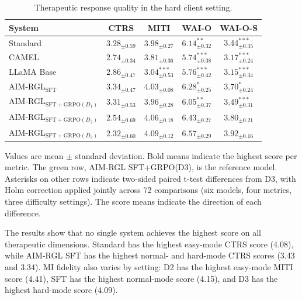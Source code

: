 \begin{table}[H]
\centering
\caption{Therapeutic response quality in the hard client setting.}
\label{tab:main-results-hard}
\small
\setlength{\tabcolsep}{4pt}
\renewcommand{\arraystretch}{1.15}
\begin{tabular}{lcccc}
\toprule
System & CTRS & MITI & WAI-O & WAI-O-S \\
\midrule
Standard & $3.28_{\pm 0.59}$ & $3.98_{\pm 0.27}$ & $6.14_{\pm 0.32}^{**}$ & $3.44_{\pm 0.35}^{***}$ \\
CAMEL & $2.74_{\pm 0.34}$ & $3.81_{\pm 0.36}$ & $5.74_{\pm 0.38}^{***}$ & $3.17_{\pm 0.24}^{***}$ \\
LLaMA Base & $2.86_{\pm 0.47}$ & $3.04_{\pm 0.53}^{***}$ & $5.76_{\pm 0.42}^{***}$ & $3.15_{\pm 0.34}^{***}$ \\
AIM-RGL$_{\mathrm{SFT}}$ & $\mathbf{3.34}_{\pm 0.47}$ & $4.03_{\pm 0.08}$ & $6.28_{\pm 0.25}^{*}$ & $3.70_{\pm 0.24}^{*}$ \\
AIM-RGL$_{\mathrm{SFT+GRPO}(D_1)}$ & $3.31_{\pm 0.53}$ & $3.96_{\pm 0.28}$ & $6.05_{\pm 0.37}^{**}$ & $3.49_{\pm 0.31}^{***}$ \\
AIM-RGL$_{\mathrm{SFT+GRPO}(D_2)}$ & $2.54_{\pm 0.69}$ & $4.06_{\pm 0.18}$ & $6.43_{\pm 0.27}$ & $3.80_{\pm 0.21}$ \\
\rowcolor{green!15}
AIM-RGL$_{\mathrm{SFT+GRPO}(D_3)}$ & $2.32_{\pm 0.60}$ & $\mathbf{4.09}_{\pm 0.12}$ & $\mathbf{6.57}_{\pm 0.29}$ & $\mathbf{3.92}_{\pm 0.16}$ \\
\bottomrule
\end{tabular}
\par\smallskip
\begin{minipage}{\textwidth}
\footnotesize
\linespread{1.1}\selectfont
Values are mean $\pm$ standard deviation. Bold means indicate the highest score per metric. The green row, AIM-RGL SFT+GRPO(D3), is the reference model. Asterisks on other rows indicate two-sided paired t-test differences from D3, with Holm correction applied jointly across 72 comparisons (six models, four metrics, three difficulty settings). The score means indicate the direction of each difference.
\end{minipage}
\end{table}

The results show that no single system achieves the highest score on all therapeutic dimensions. Standard has the highest easy-mode CTRS score (4.08), while AIM-RGL SFT has the highest normal- and hard-mode CTRS scores (3.43 and 3.34). MI fidelity also varies by setting: D2 has the highest easy-mode MITI score (4.41), SFT has the highest normal-mode score (4.15), and D3 has the highest hard-mode score (4.09).

